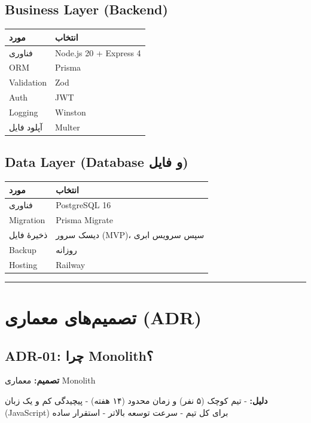 \documentclass[12pt, a4paper]{article}
\begin{document}
\subsection{Business Layer (Backend)}

\begin{longtable}[]{@{}ll@{}}
\toprule\noalign{}
مورد & انتخاب \\
\midrule\noalign{}
\endhead
\bottomrule\noalign{}
\endlastfoot
فناوری & Node.js 20 + Express 4 \\
ORM & Prisma \\
Validation & Zod \\
Auth & JWT \\
Logging & Winston \\
آپلود فایل & Multer \\
\end{longtable}

\subsection{Data Layer (Database و فایل)}

\begin{longtable}[]{@{}ll@{}}
\toprule\noalign{}
مورد & انتخاب \\
\midrule\noalign{}
\endhead
\bottomrule\noalign{}
\endlastfoot
فناوری & PostgreSQL 16 \\
Migration & Prisma Migrate \\
ذخیرهٔ فایل & دیسک سرور (MVP)، سپس سرویس ابری \\
Backup & روزانه \\
Hosting & Railway \\
\end{longtable}

\begin{center}\rule{0.5\linewidth}{0.5pt}\end{center}

\section{تصمیم‌های معماری (ADR)}

\subsection{ADR-01: چرا Monolith؟}

\textbf{تصمیم:} معماری Monolith

\textbf{دلیل:}
- تیم کوچک (۵ نفر) و زمان محدود (۱۴ هفته)
- پیچیدگی کم و یک زبان (JavaScript) برای کل تیم
- سرعت توسعه بالاتر
- استقرار ساده
\end{document}
